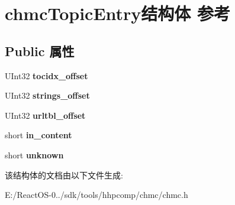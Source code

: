 \hypertarget{structchmc_topic_entry}{}\section{chmc\+Topic\+Entry结构体 参考}
\label{structchmc_topic_entry}
\subsection*{Public 属性}
\begin{DoxyCompactItemize}
\item 
\mbox{\label{structchmc_topic_entry_ad40634bf04469658358d045cf4014088}} 
U\+Int32 {\bfseries tocidx\+\_\+offset}
\item 
\mbox{\label{structchmc_topic_entry_a136885a37a236e2ba10855f06022c6e9}} 
U\+Int32 {\bfseries strings\+\_\+offset}
\item 
\mbox{\label{structchmc_topic_entry_ac32467dffd7e1b12f447fe87370a35cb}} 
U\+Int32 {\bfseries urltbl\+\_\+offset}
\item 
\mbox{\label{structchmc_topic_entry_ac81ddca95cb1a210db3b04a7135aaa21}} 
short {\bfseries in\+\_\+content}
\item 
\mbox{\label{structchmc_topic_entry_a45bfc9aaa2905aa372aa56c1e78d9bb5}} 
short {\bfseries unknown}
\end{DoxyCompactItemize}


该结构体的文档由以下文件生成\+:\begin{DoxyCompactItemize}
\item 
E\+:/\+React\+O\+S-\/0../sdk/tools/hhpcomp/chmc/chmc.\+h\end{DoxyCompactItemize}
